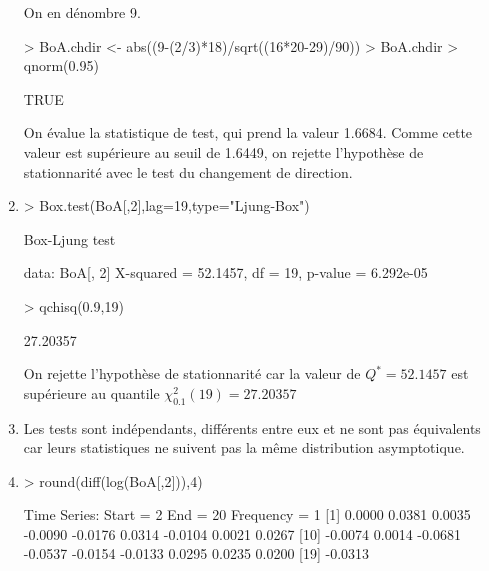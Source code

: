 \documentclass{article}
\begin{document}
\begin{enumerate}
On en dénombre 9.

\begin{Schunk}
\begin{Sinput}
> BoA.chdir <- abs((9-(2/3)*18)/sqrt((16*20-29)/90))
> BoA.chdir > qnorm(0.95)
\end{Sinput}
\begin{Soutput}
[1] TRUE
\end{Soutput}
\end{Schunk}
On évalue la statistique de test, qui prend la valeur 1.6684. Comme cette valeur est supérieure au seuil de 1.6449, on rejette l'hypothèse de stationnarité avec le test du changement de direction.
\item
\begin{Schunk}
\begin{Sinput}
> Box.test(BoA[,2],lag=19,type="Ljung-Box")
\end{Sinput}
\begin{Soutput}
	Box-Ljung test

data:  BoA[, 2] 
X-squared = 52.1457, df = 19, p-value = 6.292e-05
\end{Soutput}
\begin{Sinput}
> qchisq(0.9,19)
\end{Sinput}
\begin{Soutput}
[1] 27.20357
\end{Soutput}
\end{Schunk}

On rejette l'hypothèse de stationnarité car la valeur de $Q^{*}=52.1457$ est supérieure au quantile $\chi^2_{0.1}(19) = 27.20357$
  
\item
  Les tests sont indépendants, différents entre eux et ne sont pas équivalents car leurs statistiques ne suivent pas la même distribution asymptotique.
  
\item
\begin{Schunk}
\begin{Sinput}
> round(diff(log(BoA[,2])),4)
\end{Sinput}
\begin{Soutput}
Time Series:
Start = 2 
End = 20 
Frequency = 1 
 [1]  0.0000  0.0381  0.0035 -0.0090 -0.0176  0.0314 -0.0104  0.0021  0.0267
[10] -0.0074  0.0014 -0.0681 -0.0537 -0.0154 -0.0133  0.0295  0.0235  0.0200
[19] -0.0313
\end{Soutput}
\end{Schunk}


\end{enumerate}
\end{document}
